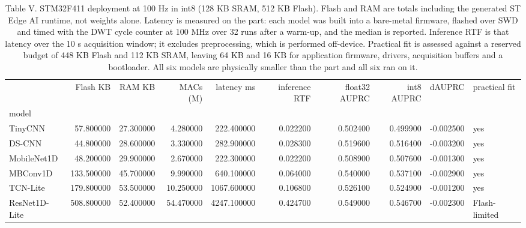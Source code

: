 \begin{table}
\caption{Table V. STM32F411 deployment at 100 Hz in int8 (128 KB SRAM, 512 KB Flash). Flash and RAM are totals including the generated ST Edge AI runtime, not weights alone. Latency is measured on the part: each model was built into a bare-metal firmware, flashed over SWD and timed with the DWT cycle counter at 100 MHz over 32 runs after a warm-up, and the median is reported. Inference RTF is that latency over the 10 s acquisition window; it excludes preprocessing, which is performed off-device. Practical fit is assessed against a reserved budget of 448 KB Flash and 112 KB SRAM, leaving 64 KB and 16 KB for application firmware, drivers, acquisition buffers and a bootloader. All six models are physically smaller than the part and all six ran on it.}
\begin{tabular}{lrrrrrrrrl}
\toprule
 & Flash KB & RAM KB & MACs (M) & latency ms & inference RTF & float32 AUPRC & int8 AUPRC & dAUPRC & practical fit \\
model &  &  &  &  &  &  &  &  &  \\
\midrule
TinyCNN & 57.800000 & 27.300000 & 4.280000 & 222.400000 & 0.022200 & 0.502400 & 0.499900 & -0.002500 & yes \\
DS-CNN & 44.800000 & 28.600000 & 3.330000 & 282.900000 & 0.028300 & 0.519600 & 0.516400 & -0.003200 & yes \\
MobileNet1D & 48.200000 & 29.900000 & 2.670000 & 222.300000 & 0.022200 & 0.508900 & 0.507600 & -0.001300 & yes \\
MBConv1D & 133.500000 & 45.700000 & 9.990000 & 640.100000 & 0.064000 & 0.540000 & 0.537100 & -0.002900 & yes \\
TCN-Lite & 179.800000 & 53.500000 & 10.250000 & 1067.600000 & 0.106800 & 0.526100 & 0.524900 & -0.001200 & yes \\
ResNet1D-Lite & 508.800000 & 52.400000 & 54.470000 & 4247.100000 & 0.424700 & 0.549000 & 0.546700 & -0.002300 & Flash-limited \\
\bottomrule
\end{tabular}
\end{table}
